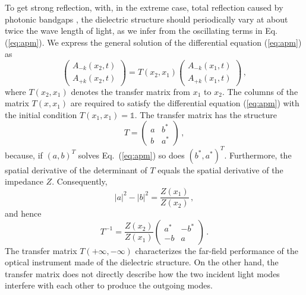 \documentclass[12pt,amsmath,amssymb]{article}
\numberwithin{equation}{section}
\begin{document}
To get strong reflection, with, in the extreme case, total reflection caused
by photonic bandgaps \cite{Joannopoulos},
the dielectric structure should periodically vary at
about twice the wave length of light, as we infer from the
oscillating terms in Eq. (\ref{eq:apm}).
We express the general solution of the differential equation (\ref{eq:apm}) as
\begin{equation}
\label{eq:connex}
\left(
    \begin{array}{c}
      A_{-k}(x_2,t) \\
      A_{+k}(x_2,t)
    \end{array}
\right)
=
T(x_2,x_1)
\left(
    \begin{array}{c}
      A_{-k}(x_1,t) \\
      A_{+k}(x_1,t)
    \end{array}
\right)\,,
\end{equation}
where $T(x_2,x_1)$ denotes the transfer matrix from $x_1$ to
$x_2$. The columns of the matrix $T(x,x_1)$ are required to
satisfy the differential equation  (\ref{eq:apm}) with the
initial condition $T(x_1,x_1)=\mathds{1}$. The transfer matrix has
the structure
\begin{equation}
\label{eq:trans}
T =
\left(
    \begin{array}{cc}
      a & b^* \\
      b & a^*
    \end{array}
\right) \,,
\end{equation}
because, if $(a,b)^T$ solves Eq.\ (\ref{eq:apm}) so does $(b^*,a^*)^T$.
Furthermore, the spatial derivative of the determinant of $T$ equals the
spatial derivative of the impedance $Z$. Consequently,
\begin{equation}
\label{eq:det}
|a|^2-|b|^2 = \frac{Z(x_1)}{Z(x_2)}\,,
\end{equation}
and hence
\begin{equation}
\label{eq:invt}
T^{-1} =
 \frac{Z(x_2)}{Z(x_1)}
\left(
    \begin{array}{cc}
      a^* & -b^* \\
      -b & a
    \end{array}
\right) \,.
\end{equation}
The transfer matrix $T(+\infty,-\infty)$ characterizes the far-field
performance of the optical instrument made of the dielectric structure.
On the other hand, the transfer matrix does not directly describe
how the two incident light modes interfere with each other to produce
the outgoing modes.
\end{document}

